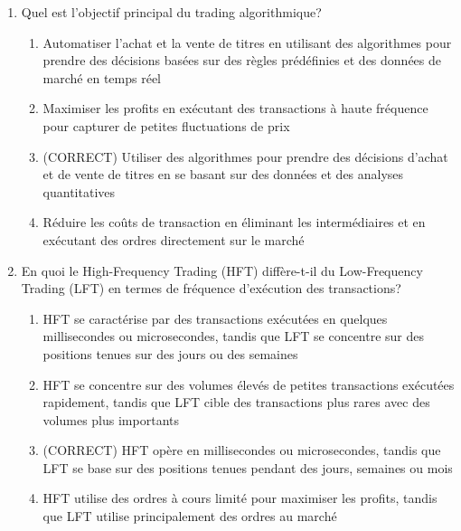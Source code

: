 \documentclass[a4paper,12pt]{article}
\begin{document}
\begin{enumerate}
    \item Quel est l'objectif principal du trading algorithmique?
    \begin{enumerate}[label=(\Alph*)]
        \item Automatiser l'achat et la vente de titres en utilisant des algorithmes pour prendre des décisions basées sur des règles prédéfinies et des données de marché en temps réel
        \item Maximiser les profits en exécutant des transactions à haute fréquence pour capturer de petites fluctuations de prix
        \item (CORRECT) Utiliser des algorithmes pour prendre des décisions d'achat et de vente de titres en se basant sur des données et des analyses quantitatives
        \item Réduire les coûts de transaction en éliminant les intermédiaires et en exécutant des ordres directement sur le marché
    \end{enumerate}

    \item En quoi le High-Frequency Trading (HFT) diffère-t-il du Low-Frequency Trading (LFT) en termes de fréquence d'exécution des transactions?
    \begin{enumerate}[label=(\Alph*)]
        \item HFT se caractérise par des transactions exécutées en quelques millisecondes ou microsecondes, tandis que LFT se concentre sur des positions tenues sur des jours ou des semaines
        \item HFT se concentre sur des volumes élevés de petites transactions exécutées rapidement, tandis que LFT cible des transactions plus rares avec des volumes plus importants
        \item (CORRECT) HFT opère en millisecondes ou microsecondes, tandis que LFT se base sur des positions tenues pendant des jours, semaines ou mois
        \item HFT utilise des ordres à cours limité pour maximiser les profits, tandis que LFT utilise principalement des ordres au marché
    \end{enumerate}


\end{enumerate}
\end{document}
